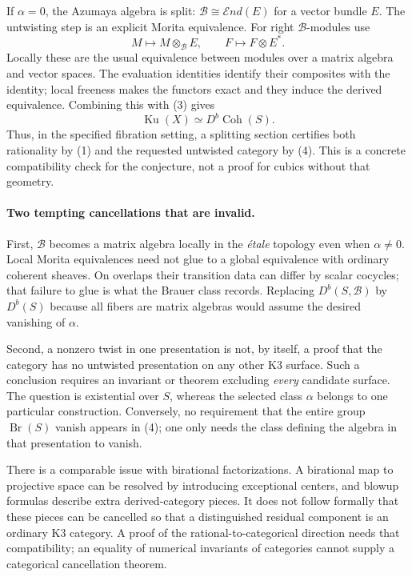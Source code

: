 \documentclass[11pt]{article}
\begin{document}
If $\alpha=0$, the Azumaya algebra is split: $\mathcal B\cong\mathcal End(E)$ for a vector bundle $E$. The untwisting step is an explicit Morita equivalence. For right $\mathcal B$-modules use
\[
 M\longmapsto M\otimes_{\mathcal B}E,
 \qquad F\longmapsto F\otimes E^*.
\]
Locally these are the usual equivalence between modules over a matrix algebra and vector spaces. The evaluation identities identify their composites with the identity; local freeness makes the functors exact and they induce the derived equivalence. Combining this with (3) gives
\[
 \operatorname{Ku}(X)\simeq D^b\operatorname{Coh}(S).
                                                               \tag{4}
\]
Thus, in the specified fibration setting, a splitting section certifies both rationality by (1) and the requested untwisted category by (4). This is a concrete compatibility check for the conjecture, not a proof for cubics without that geometry.

\paragraph{Two tempting cancellations that are invalid.}
First, $\mathcal B$ becomes a matrix algebra locally in the \emph{\'etale} topology even when $\alpha\ne0$. Local Morita equivalences need not glue to a global equivalence with ordinary coherent sheaves. On overlaps their transition data can differ by scalar cocycles; that failure to glue is what the Brauer class records. Replacing $D^b(S,\mathcal B)$ by $D^b(S)$ because all fibers are matrix algebras would assume the desired vanishing of $\alpha$.

Second, a nonzero twist in one presentation is not, by itself, a proof that the category has no untwisted presentation on any other K3 surface. Such a conclusion requires an invariant or theorem excluding \emph{every} candidate surface. The question is existential over $S$, whereas the selected class $\alpha$ belongs to one particular construction. Conversely, no requirement that the entire group $\operatorname{Br}(S)$ vanish appears in (4); one only needs the class defining the algebra in that presentation to vanish.

There is a comparable issue with birational factorizations. A birational map to projective space can be resolved by introducing exceptional centers, and blowup formulas describe extra derived-category pieces. It does not follow formally that these pieces can be cancelled so that a distinguished residual component is an ordinary K3 category. A proof of the rational-to-categorical direction needs that compatibility; an equality of numerical invariants of categories cannot supply a categorical cancellation theorem.
\end{document}
